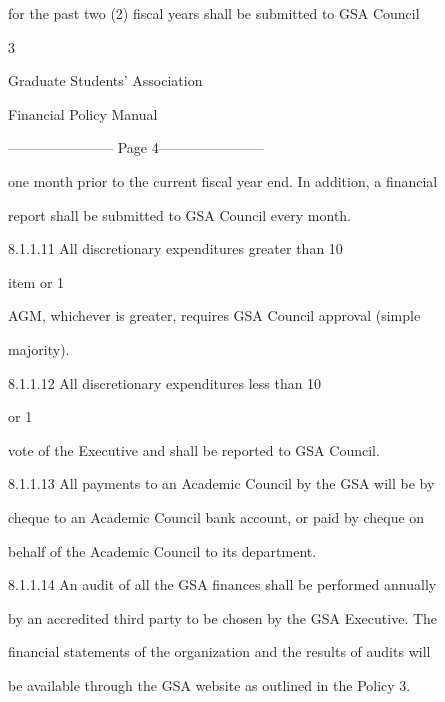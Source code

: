     for the  past two  (2) fiscal  years  shall  be  submitted  to  GSA  Council  



                                                3  

                              

                              

                            Graduate Students’ Association  

                                Financial Policy Manual  

  


----------------------- Page 4-----------------------

     one month prior to the current fiscal year end. In addition, a financial  

     report shall be submitted to GSA Council every month.  



8.1.1.11  All discretionary expenditures greater  than  10%

     item  or  1%

     AGM, whichever  is greater, requires  GSA  Council  approval (simple  

     majority).  



8.1.1.12  All discretionary expenditures less than 10%

     or 1%

     vote of the Executive and shall be reported to GSA Council.  



8.1.1.13  All payments to  an Academic Council by the GSA will be by  

     cheque to  an Academic Council bank  account, or paid by cheque on  

     behalf of the Academic Council to its department.   



8.1.1.14  An audit of all the GSA finances shall be performed annually  

     by an accredited third party to be chosen by the GSA Executive. The  

     financial statements of the organization and the results of audits will  

     be  available  through  the  GSA  website  as  outlined  in  the  Policy  3.  


